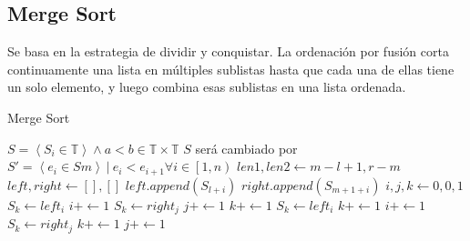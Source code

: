 \documentclass[]{article}
\begin{document}
\subsection{Merge Sort} \label{algoritmos:mergesort}
Se basa en la estrategia de dividir y conquistar. La ordenación por fusión corta continuamente una lista en múltiples sublistas hasta que cada una de ellas tiene un solo elemento, y luego combina esas sublistas en una lista ordenada.
\begin{algorithm}[h]
    \caption{Merge Sort}
    \begin{algorithmic}[1]
        \Require $S=\left< S_i \in \mathbb{T} \right> \land a<b \in \mathbb{T} \times \mathbb{T}$
        \Ensure $S$ será cambiado por $S' = \left< e_i \in S m\right> ~ | ~ e_i < e_{i+1} \forall i \in \left[1,n\right)$
        \State $len1,len2 \leftarrow m-l+1,r-m$
        \State $left,right \gets [],[]$
        \State $left.append(S_{l+i})$
        \EndFor
        \State $right.append(S_{m+1+i})$
        \EndFor
        \State $i,j,k \gets 0,0,1$
        \State $S_k \gets left_i$
        \State $i+ \gets 1$
        \Else
        \State $S_k \gets right_j$
        \State $j+ \gets 1$
        \EndIf
        \State $k+ \gets 1$
        \EndWhile
        \State $S_k \gets left_i$
        \State $k+ \gets 1$
        \State $i+ \gets 1$
        \EndWhile
        \State $S_k \gets right_j$
        \State $k+ \gets 1$
        \State $j+ \gets 1$
        \EndWhile
        \EndProcedure
    \end{algorithmic}
\end{algorithm}
\end{document}
